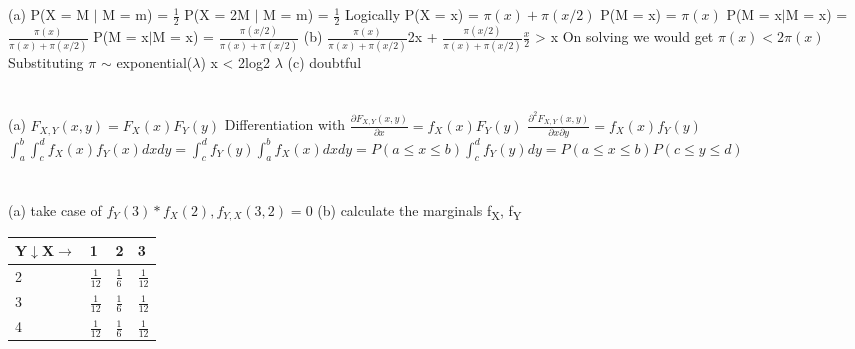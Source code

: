 \documentclass{report}
\begin{document}
\section{}
(a) P(X = M $\vert$ M = m) = $\frac{1}{2}$ \newline P(X = 2M $\vert$ M = m) = $\frac{1}{2}$ Logically
P(X = x) = $\pi(x) + \pi(x/2)$
\newline
P(M = x) = $\pi(x)$
P(M = x$\vert$M = x) = $\frac{\pi(x)}{\pi(x) + \pi(x/2)}$
\newline
P(M = x$\vert$M = x) = $\frac{\pi(x/2)}{\pi(x) + \pi(x/2)}$
\newline
(b) $\frac{\pi(x)}{\pi(x) + \pi(x/2)}$2x + $\frac{\pi(x/2)}{\pi(x) + \pi(x/2)}$$\frac{x}{2}$ > x
On solving we would get
$\pi(x) < 2\pi(x)$
\newline
Substituting $\pi$ $\sim$ exponential($\lambda$)
x < 2log2 $\lambda$
\newline
(c) doubtful

\section{}
(a) $F_{X, Y}(x, y) = F_X(x)F_Y(y)$
\newline
Differentiation with $\frac{\partial F_{X, Y}(x, y)}{\partial x} = f_X(x)F_Y(y)$ 
\newline
$\frac{\partial^2 F_{X, Y}(x, y)}{\partial x \partial y} = f_X(x)f_Y(y)$ 
\newline
$\int_{a}^{b}\int_{c}^{d}f_X(x)f_Y(x)dxdy = \int_{c}^{d}f_Y(y)\int_{a}^{b}f_X(x)dxdy = P(a \le x \le b)\int_{c}^{d}f_Y(y)dy = P(a \le x \le b)P(c \le y \le d)$
\newline

\section{}
(a) take case of $f_Y(3)*f_X(2), f_{Y, X}(3, 2) = 0$
\newline
(b) calculate the marginals f{\textsubscript{X}}, f{\textsubscript{Y}}
\newline
\begin{tabular}{ |p{3cm}||p{3cm}|p{3cm}|p{3cm}|  }
	\hline
	Y$\downarrow$X$\rightarrow$& 1 & 2 & 3\\
	\hline
	2   & $\frac{1}{12}$ & $\frac{1}{6}$ &   $\frac{1}{12}$\\
	3   &   $\frac{1}{12}$ & $\frac{1}{6}$   & $\frac{1}{12}$ \\
	4   & $\frac{1}{12}$ & $\frac{1}{6}$ &  $\frac{1}{12}$\\
	\hline
\end{tabular}
\newline
\end{document}

